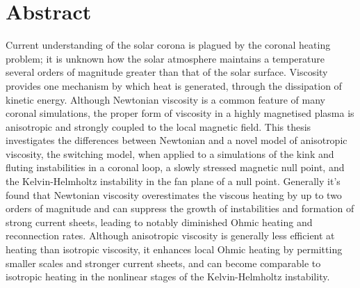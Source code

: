 \chapter{Abstract}

Current understanding of the solar corona is plagued by the coronal heating problem; it is unknown how the solar atmosphere maintains a temperature several orders of magnitude greater than that of the solar surface. Viscosity provides one mechanism by which heat is generated, through the dissipation of kinetic energy. Although Newtonian viscosity is a common feature of many coronal simulations, the proper form of viscosity in a highly magnetised plasma is anisotropic and strongly coupled to the local magnetic field. This thesis investigates the differences between Newtonian and a novel model of anisotropic viscosity, the switching model, when applied to a simulations of the kink and fluting instabilities in a coronal loop, a slowly stressed magnetic null point, and the Kelvin-Helmholtz instability in the fan plane of a null point. Generally it's found that Newtonian viscosity overestimates the viscous heating by up to two orders of magnitude and can suppress the growth of instabilities and formation of strong current sheets, leading to notably diminished Ohmic heating and reconnection rates. Although anisotropic viscosity is generally less efficient at heating than isotropic viscosity, it enhances local Ohmic heating by permitting smaller scales and stronger current sheets, and can become comparable to isotropic heating in the nonlinear stages of the Kelvin-Helmholtz instability.
